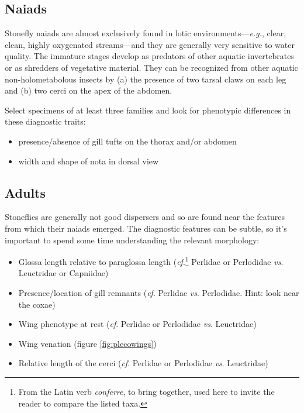 \subsection*{Naiads}
Stonefly naiads are almost exclusively found in lotic environments---\textit{e.g.}, clear, clean, highly oxygenated streams---and they are generally very sensitive to water quality. The immature stages develop as predators of other aquatic invertebrates or as shredders of vegetative material. They can be recognized from other aquatic non-holometabolous insects by (a) the presence of two tarsal claws on each leg and (b) two cerci on the apex of the abdomen.\vspace{3mm}

\noindent{}Select specimens of at least three families and look for phenotypic differences in these diagnostic traits:
\begin{itemize}
\item presence/absence of gill tufts on the thorax and/or abdomen
\item width and shape of nota in dorsal view
\end{itemize}

\subsection*{Adults}
Stoneflies are generally not good dispersers and so are found near the features from which their naiads emerged. The diagnostic features can be subtle, so it's important to spend some time understanding the relevant morphology:

\begin{itemize}
\item Glossa length relative to paraglossa length (\textit{cf}.\footnote{From the Latin verb \textit{conferre}, to bring together, used here to invite the reader to compare the listed taxa.} Perlidae or Perlodidae \textit{vs}. Leuctridae or Capniidae)
\item Presence/location of gill remnants (\textit{cf}. Perlidae \textit{vs}. Perlodidae. Hint: look near the coxae)
\item Wing phenotype at rest (\textit{cf}. Perlidae or Perlodidae \textit{vs}. Leuctridae)
\item Wing venation (figure \ref{fig:plecowings})
\item Relative length of the cerci (\textit{cf}. Perlidae or Perlodidae \textit{vs}. Leuctridae)
\end{itemize}

